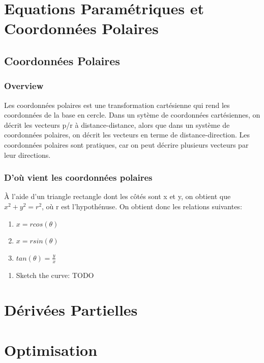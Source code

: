 \documentclass{article}
\begin{document}
\section{Equations Paramétriques et Coordonnées Polaires}

\subsection{Coordonnées Polaires}%
\label{ssub:Coordonnées Polaires}

\subsubsection{Overview}%
\label{ssub:Overview}

Les coordonnées polaires est une transformation cartésienne qui rend
les coordonnées de la base en cercle. Dans un sytème de coordonnées
cartésiennes, on décrit les vecteurs p/r à distance-distance, alors que
dans un système de coordonnées polaires, on décrit les vecteurs en
terme de distance-direction. Les coordonnées polaires sont pratiques, car
on peut décrire plusieurs vecteurs par leur directions.

\subsubsection{D'où vient les coordonnées polaires}%
\label{ssub:D'où vient les coordonnées polaires}

À l'aide d'un triangle rectangle dont les côtés sont x et y, on obtient que
$ x^2 + y^2 = r^2$, où r est l'hypothénuse. On obtient donc les relations
suivantes:
\begin{enumerate}
    \item $x=rcos(\theta)$
    \item $x=rsin(\theta)$
    \item $tan(\theta) = \frac{y}{x} $
\end{enumerate}

\begin{problem}
    \begin{enumerate}
        \item Sketch the curve: TODO
    \end{enumerate}
\end{problem}


\section{Dérivées Partielles}
\section{Optimisation}
\end{document}
